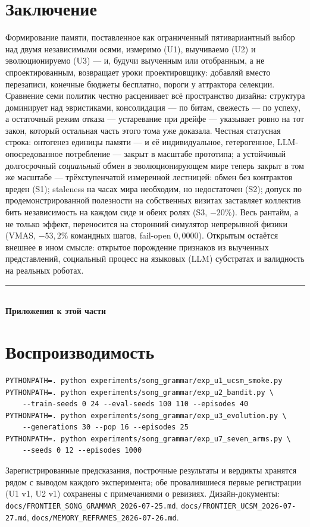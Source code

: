 \documentclass{article}
\begin{document}
\section{Заключение}

Формирование памяти, поставленное как ограниченный пятивариантный
выбор над двумя независимыми осями, измеримо (U1), выучиваемо (U2) и
эволюционируемо (U3) --- и, будучи выученным или отобранным, а не
спроектированным, возвращает уроки проектировщику: добавляй вместо
перезаписи, конечные бюджеты бесплатно, пороги у аттрактора селекции.
Сравнение семи политик честно расценивает всё пространство дизайна:
структура доминирует над эвристиками, консолидация --- по битам,
свежесть --- по успеху, а остаточный режим отказа --- устаревание при
дрейфе --- указывает ровно на тот закон, который остальная часть
этого тома уже доказала. Честная статусная строка: онтогенез единицы
памяти --- и её индивидуальное, гетерогенное, LLM-опосредованное
потребление --- закрыт в масштабе прототипа; а устойчивый долгосрочный
\emph{социальный} обмен в эволюционирующем мире теперь закрыт в том
же масштабе --- трёхступенчатой измеренной лестницей: обмен без
контрактов вреден (S1); staleness на часах мира необходим, но
недостаточен (S2); допуск по продемонстрированной полезности на
собственных визитах заставляет коллектив бить независимость на
каждом сиде и обеих ролях (S3, $-20\%$). Весь рантайм, а не только
эффект, переносится на сторонний симулятор непрерывной физики (VMAS,
$-53{,}2\%$ командных шагов, fail-open $0{,}0000$). Открытым остаётся
внешнее в ином смысле: открытое порождение признаков из выученных
представлений, социальный процесс на языковых (LLM) субстратах и
валидность на реальных роботах.



\FloatBarrier
\begin{center}\rule{0.55\linewidth}{0.4pt}\\[2pt]\textbf{Приложения к этой части}\end{center}


\section{Воспроизводимость}
\label{p5:app:repro}
\begin{verbatim}
PYTHONPATH=. python experiments/song_grammar/exp_u1_ucsm_smoke.py
PYTHONPATH=. python experiments/song_grammar/exp_u2_bandit.py \
    --train-seeds 0 24 --eval-seeds 100 110 --episodes 40
PYTHONPATH=. python experiments/song_grammar/exp_u3_evolution.py \
    --generations 30 --pop 16 --episodes 25
PYTHONPATH=. python experiments/song_grammar/exp_u7_seven_arms.py \
    --seeds 0 12 --episodes 1000
\end{verbatim}
Зарегистрированные предсказания, построчные результаты и вердикты
хранятся рядом с выводом каждого эксперимента; обе провалившиеся
первые регистрации (U1 v1, U2 v1) сохранены с примечаниями о
ревизиях. Дизайн-документы:
\texttt{docs/FRONTIER\_SONG\_GRAMMAR\_2026-07-25.md},
\texttt{docs/FRONTIER\_UCSM\_2026-07-27.md},
\texttt{docs/MEMORY\_REFRAMES\_2026-07-26.md}.
\FloatBarrier
\end{document}

